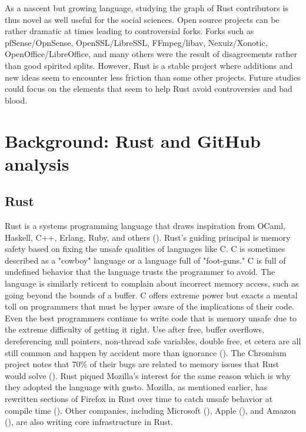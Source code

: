 \documentclass[12pt, a4paper]{article}
\begin{document}
As a nascent but growing language, studying the graph of Rust contributors is thus novel as well useful for the social sciences. Open source projects can be rather dramatic at times leading to controversial forks. Forks such as pfSense/OpnSense, OpenSSL/LibreSSL, FFmpeg/libav, Nexuiz/Xonotic, OpenOffice/LibreOffice, and many others were the result of disagreements rather than good spirited splits. However, Rust is a stable project where additions and new ideas seem to encounter less friction than some other projects. Future studies could focus on the elements that seem to help Rust avoid controversies and bad blood.

\section{Background: Rust and GitHub analysis}
\subsection{Rust}
Rust is a systems programming language that draws inspiration from OCaml, Haskell, C++, Erlang, Ruby, and others (\cite{rustlang}). Rust's guiding principal is memory safety based on fixing the unsafe qualities of languages like C. C is sometimes described as a "cowboy" language or a language full of "foot-guns." C is full of undefined behavior that the language trusts the programmer to avoid. The language is similarly reticent to complain about incorrect memory access, such as going beyond the bounds of a buffer. C offers extreme power but exacts a mental toll on programmers that must be hyper aware of the implications of their code. Even the best programmers continue to write code that is memory unsafe due to the extreme difficulty of getting it right. Use after free, buffer overflows, dereferencing null pointers, non-thread safe variables, double free, et cetera are all still common and happen by accident more than ignorance (\cite{hosfeltsafety2019}). The Chromium project notes that 70\% of their bugs are related to memory issues that Rust would solve (\cite{chromiummem70}). Rust piqued Mozilla's interest for the same reason which is why they adopted the language with gusto. Mozilla, as mentioned earlier, has rewritten sections of Firefox in Rust over time to catch unsafe behavior at compile time (\cite{hosfeltrewrite2019}). Other companies, including Microsoft (\cite{microsoftrust2020}), Apple (\cite{applerust2020}), and Amazon (\cite{amazonrust2020}), are also writing core infrastructure in Rust.
\end{document}
